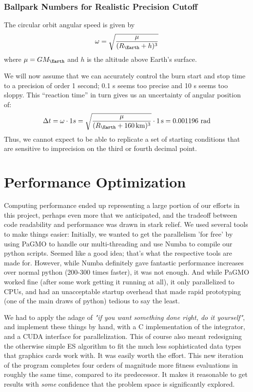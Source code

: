 \subsubsection{Ballpark Numbers for Realistic Precision Cutoff}
The circular orbit angular speed is given by
\begin{equation}
    \omega = \sqrt{\frac{\mu}{(R_\Earth + h)^3}}    
\end{equation}
where $\mu = G M_\Earth$ and $h$ is the altitude above Earth's surface. 

We will now assume that we can accurately control the burn start and stop time to a precision of order 1 second; 0.1 s seems too precise and 10 s seems too sloppy. This ``reaction time'' in turn gives us an uncertainty of angular position of:
\begin{equation}
    \Delta t = \omega \cdot 1 s = \sqrt{\frac{\mu}{(R_\Earth + \SI{160}{\km})^3}} \cdot \SI{1}{\second} = 0.001196 \ \text{rad}
\end{equation}
Thus, we cannot expect to be able to replicate a set of starting conditions that are sensitive to imprecision on the third or fourth decimal point.


\section{Performance Optimization}
Computing performance ended up representing a large portion of our efforts in this project, perhaps even more that we anticipated, and the tradeoff between code readability and performance was drawn in stark relief. We used several tools to make things easier: Initially, we wanted to get the parallelism 'for free' by using PaGMO to handle our multi-threading and use Numba to compile our python scripts. Seemed like a good idea; that's what the respective tools are made for. However, while Numba definitely gave fantastic performance increases over normal python (200-300 times faster), it was not enough. And while PaGMO worked fine (after some work getting it running at all), it only parallelized to CPUs, and had an unacceptable startup overhead that made rapid prototyping (one of the main draws of python) tedious to say the least. 

We had to apply the adage of \textit{"if you want something done right, do it yourself"}, and implement these things by hand, with a C implementation of the integrator, and a CUDA interface for parallelization. This of course also meant redesigning the otherwise simple ES algorithm to fit the much less sophisticated data types that graphics cards work with. It was easily worth the effort. This new iteration of the program completes four orders of magnitude more fitness evaluations in roughly the same time, compared to its predecessor. It makes it reasonable to get results with \textit{some} confidence that the problem space is significantly explored. 


